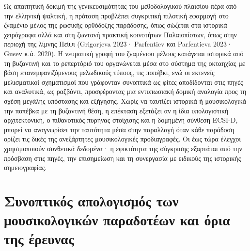 \documentclass[11pt,a4paper]{article}
\begin{document}
Ως απαιτητική δοκιμή της γενικευσιμότητας του μεθοδολογικού πλαισίου πέρα από την ελληνική ψαλτική, η πρόταση προβλέπει συγκριτική πιλοτική εφαρμογή στο ζναμένιο μέλος της ρωσικής ορθόδοξης παράδοσης, όπως σώζεται στα ιστορικά χειρόγραφα αλλά και στη ζωντανή πρακτική κοινοτήτων Παλαιοπίστων, όπως στην περιοχή της λίμνης Πείψι (Grigorjeva 2023· Parfentiev και Parfentieva 2023· Gusev κ.ά. 2020). Η νευματική γραφή του ζναμένιου μέλους κατάγεται ιστορικά από τη βυζαντινή και το ρεπερτόριό του οργανώνεται μέσα στο σύστημα της οκταηχίας με βάση επανεμφανιζόμενους μελωδικούς τύπους, τις ποπέβκι, ενώ οι εκτενείς μελισματικοί σχηματισμοί που γράφονταν συνοπτικά ως φίτες αποδίδονται στις πηγές και αναλυτικά, ως ραζβόντι, προσφέροντας μια εντυπωσιακή δομική αναλογία προς τη σχέση μεγάλης υπόστασης και εξήγησης. Χωρίς να ταυτίζει ιστορικά ή μουσικολογικά την ποπέβκα με τη βυζαντινή θέση, η επέκταση εξετάζει αν η ίδια υπολογιστική αρχιτεκτονική, ο πιθανοτικός πυρήνας στοίχισης και η δομημένη σύνθεση ECSI-D, μπορεί να αναγνωρίσει την ταυτότητα μέσα στην παραλλαγή όταν κάθε παράδοση ορίζει τις δικές της ανεξάρτητες μουσικολογικές προδιαγραφές. Οι έως τώρα έλεγχοι χρησιμοποιούν συνθετικά δεδομένα· η εφικτότητα της σύγκρισης εξαρτάται από την πρόσβαση στις πηγές, την επισημείωση και τη συνεργασία με ειδικούς της ιστορικής σημειογραφίας.

\section{Συνοπτικός απολογισμός των μουσικολογικών παραδοτέων και όρια της έρευνας}
\end{document}
